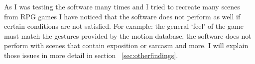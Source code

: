 As I was testing the software many times and I tried to recreate many scenes from RPG games I have noticed that the software does not perform as well if certain conditions are not satisfied. For example: the general `feel' of the game must match the gestures provided by the motion database, the software does not perform with scenes that contain exposition or sarcasm and more. I will explain those issues in more detail in section ~\ref{sec:otherfindings}.




